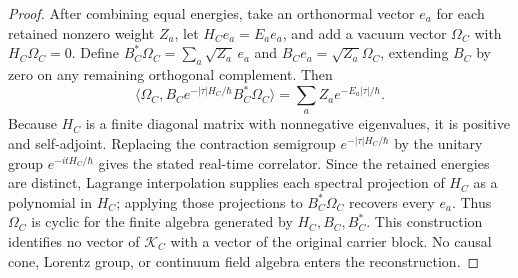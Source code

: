 \documentclass[12pt,a4paper]{article}
\begin{document}
\begin{proof}
After combining equal energies, take an orthonormal vector \(e_a\) for each
retained nonzero weight \(Z_a\), let
\(H_Ce_a=E_ae_a\), and add a vacuum vector \(\Omega_C\) with
\(H_C\Omega_C=0\).  Define
\(B_C^*\Omega_C=\sum_a\sqrt{Z_a}\,e_a\) and
\(B_Ce_a=\sqrt{Z_a}\Omega_C\), extending \(B_C\) by zero on any remaining
orthogonal complement.  Then
\[
\langle\Omega_C,
B_Ce^{-|\tau|H_C/\hbar}B_C^*\Omega_C\rangle
=\sum_a Z_a e^{-E_a|\tau|/\hbar}.
\]
Because \(H_C\) is a finite diagonal matrix with nonnegative eigenvalues, it
is positive and self-adjoint.  Replacing the contraction semigroup
\(e^{-|\tau|H_C/\hbar}\) by the unitary group \(e^{-itH_C/\hbar}\) gives the
stated real-time correlator.  Since the retained energies are distinct,
Lagrange interpolation supplies each spectral projection of \(H_C\) as a
polynomial in \(H_C\); applying those projections to
\(B_C^*\Omega_C\) recovers every \(e_a\).  Thus \(\Omega_C\) is cyclic for
the finite algebra generated by \(H_C,B_C,B_C^*\).  This construction identifies no vector of
\(\mathcal K_C\) with a vector of the original carrier block.  No causal
cone, Lorentz group, or continuum field algebra enters the reconstruction.
\end{proof}
\end{document}
